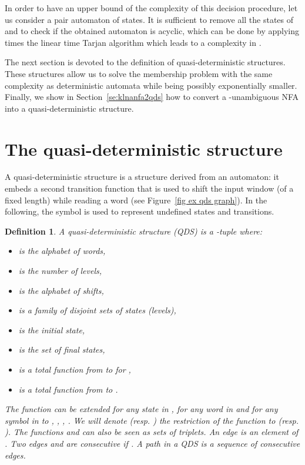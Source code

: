\documentclass[11pt]{elsarticle}
\newtheorem{definition}{Definition}
\newcommand\modif[2]{{#2}}
\begin{document}
\modif{}{In order to have an upper bound of the complexity of this decision procedure, let us consider a pair automaton   of  states. It is sufficient to remove all the states  of  and to check if the obtained automaton is acyclic, which can be done by applying  times the linear time Tarjan  algorithm \cite{Tar72}  which leads to a complexity in .}

The next section is devoted to the definition of quasi-deterministic structures. These structures allow us to solve the membership problem with the same complexity as deterministic automata 
while being possibly exponentially smaller. Finally, we show in Section~\ref{se:klnanfa2qds} how to convert a -unambiguous NFA into a quasi-deterministic structure.

\section{The quasi-deterministic structure}\label{se:qds}

A quasi-deterministic structure is 
a structure 
derived from an automaton: it embeds a second transition function
 that is 
used to shift the input window 
(of a fixed length) 
while reading a word (see Figure~\ref{fig ex qds graph}). 
In the following, the symbol  is used to represent undefined states and transitions.

\begin{definition}
  A \emph{quasi-deterministic structure} (QDS) is a -tuple   where:
  \begin{itemize}
    \item  is the alphabet of words,
    \item  is the number of levels,
    \item  is the alphabet of shifts,
    \item  is a family of  disjoint set\modif{}{s} of states (levels),
    \item  is the initial state,
    \item  is the set of final states,
    \item  is a \modif{}{total} function from  to  for ,
    \item  is a \modif{}{total} function from  to .  \end{itemize}
  
  The function  can be extended for any state  in ,\modif{ for any state  in ,}{} for any word  in  and for any symbol  in  to , \modif{}{}, , . We will denote  (resp. ) the restriction of the function  to  (resp. ). The functions  and  can also be seen as sets of triplets. An \emph{edge} is an element of . Two edges  and   are consecutive if .
A \emph{path} in a QDS is a sequence   of \modif{}{consecutive} edges.  

\end{definition}
\end{document}
